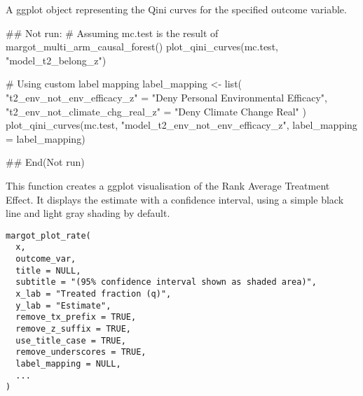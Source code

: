 \documentclass[a4paper]{book}
\begin{document}
%
\begin{Value}
A ggplot object representing the Qini curves for the specified outcome variable.
\end{Value}
%
\begin{Examples}
\begin{ExampleCode}
## Not run: 
# Assuming mc.test is the result of margot_multi_arm_causal_forest()
plot_qini_curves(mc.test, "model_t2_belong_z")

# Using custom label mapping
label_mapping <- list(
  "t2_env_not_env_efficacy_z" = "Deny Personal Environmental Efficacy",
  "t2_env_not_climate_chg_real_z" = "Deny Climate Change Real"
)
plot_qini_curves(mc.test, "model_t2_env_not_env_efficacy_z", label_mapping = label_mapping)

## End(Not run)

\end{ExampleCode}
\end{Examples}
%
\begin{Description}
This function creates a ggplot visualisation of the Rank Average Treatment Effect.
It displays the estimate with a confidence interval, using a simple black line
and light gray shading by default.
\end{Description}
%
\begin{Usage}
\begin{verbatim}
margot_plot_rate(
  x,
  outcome_var,
  title = NULL,
  subtitle = "(95% confidence interval shown as shaded area)",
  x_lab = "Treated fraction (q)",
  y_lab = "Estimate",
  remove_tx_prefix = TRUE,
  remove_z_suffix = TRUE,
  use_title_case = TRUE,
  remove_underscores = TRUE,
  label_mapping = NULL,
  ...
)
\end{verbatim}
\end{Usage}
%
\end{document}

